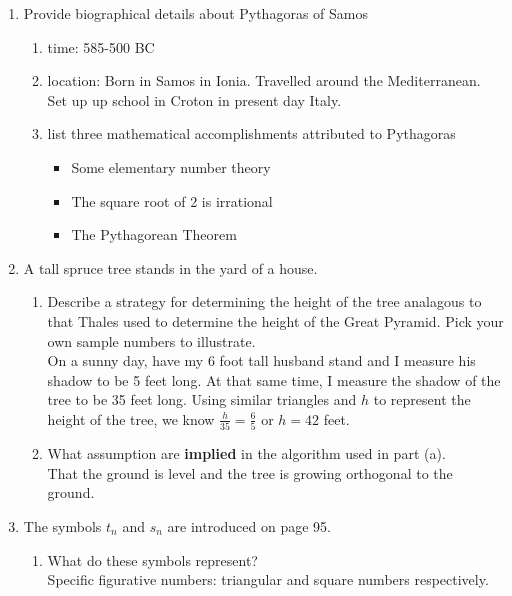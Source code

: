 \documentclass[12pt]{article}
\begin{document}
\begin{enumerate}
\item Provide biographical details about Pythagoras of Samos
	\begin{enumerate}
	\item time: 585-500 BC
	\item location: Born in Samos in Ionia. Travelled around the Mediterranean. Set up up school in Croton in present day Italy.
	\item list three mathematical accomplishments attributed to Pythagoras
		\begin{itemize}
		\item Some elementary number theory
		\item The square root of 2 is irrational
		\item The Pythagorean Theorem
		\end{itemize}
	\end{enumerate}

\item A tall spruce tree stands in the yard of a house. 
	\begin{enumerate}
	\item Describe a strategy for determining the height of the tree analagous to that Thales used to determine the height of the Great Pyramid. Pick your own sample numbers to illustrate.\\
	
	On a sunny day, have my 6 foot tall husband stand and I measure his shadow to be 5 feet long. At that same time, I measure the shadow of the tree to be 35 feet long. Using similar triangles and $h$ to represent the height of the tree, we know $\frac{h}{35}=\frac{6}{5}$ or $h=42$ feet.
	
	\item What assumption are \textbf{implied} in the algorithm used in part (a).\\
	That the ground is level and the tree is growing orthogonal to the ground.\\
	
	\end{enumerate}
\item The symbols $t_n$ and $s_n$ are introduced on page 95.
	\begin{enumerate}
	\item What do these symbols represent?\\
	
	Specific figurative numbers: triangular and square numbers respectively.\\


\end{enumerate}
\end{enumerate}
\end{document}
